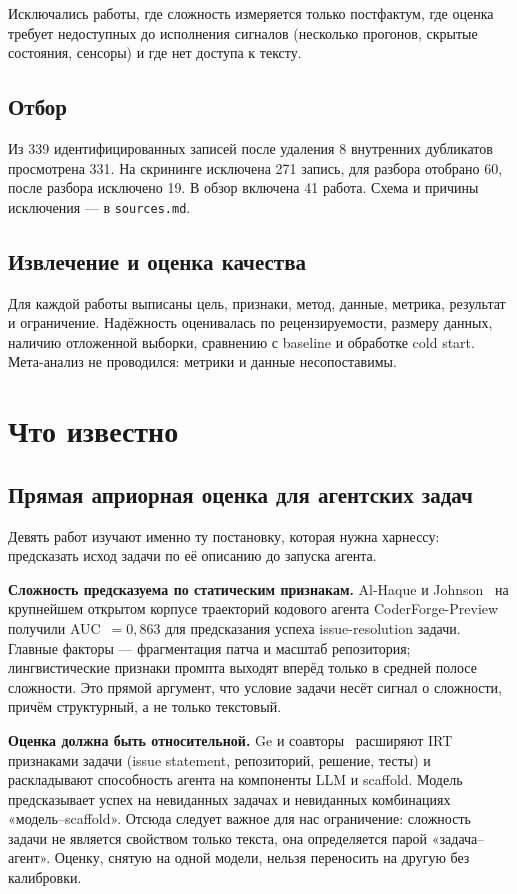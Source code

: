 \documentclass[11pt,a4paper]{article}
\begin{document}
Исключались работы, где сложность измеряется только постфактум, где оценка
требует недоступных до исполнения сигналов (несколько прогонов, скрытые
состояния, сенсоры) и где нет доступа к тексту.

\subsection{Отбор}

Из 339 идентифицированных записей после удаления 8 внутренних дубликатов
просмотрена 331. На скрининге исключена 271 запись, для разбора отобрано 60,
после разбора исключено 19. В обзор включена 41 работа. Схема и причины
исключения — в \texttt{sources.md}.

\subsection{Извлечение и оценка качества}

Для каждой работы выписаны цель, признаки, метод, данные, метрика, результат и
ограничение. Надёжность оценивалась по рецензируемости, размеру данных,
наличию отложенной выборки, сравнению с baseline и обработке cold start.
Мета-анализ не проводился: метрики и данные несопоставимы.

\section{Что известно}

\subsection{Прямая априорная оценка для агентских задач}

Девять работ изучают именно ту постановку, которая нужна харнессу: предсказать
исход задачи по её описанию до запуска агента.

\textbf{Сложность предсказуема по статическим признакам.}
Al-Haque и Johnson~\cite{alhaque2026difficult} на крупнейшем открытом корпусе
траекторий кодового агента CoderForge-Preview получили AUC~$=0{,}863$ для
предсказания успеха issue-resolution задачи. Главные факторы — фрагментация
патча и масштаб репозитория; лингвистические признаки промпта выходят вперёд
только в средней полосе сложности. Это прямой аргумент, что условие задачи
несёт сигнал о сложности, причём структурный, а не только текстовый.

\textbf{Оценка должна быть относительной.}
Ge и соавторы~\cite{ge2026psychometrics} расширяют IRT признаками задачи
(issue statement, репозиторий, решение, тесты) и раскладывают способность
агента на компоненты LLM и scaffold. Модель предсказывает успех на невиданных
задачах и невиданных комбинациях «модель--scaffold». Отсюда следует важное для
нас ограничение: сложность задачи не является свойством только текста, она
определяется парой «задача--агент». Оценку, снятую на одной модели, нельзя
переносить на другую без калибровки.
\end{document}
